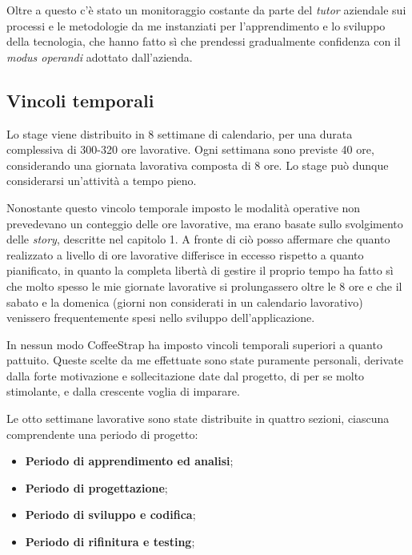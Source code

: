 Oltre a questo c'è stato un monitoraggio costante da parte del \textit{tutor} aziendale sui processi e le metodologie da me instanziati per l'apprendimento e lo sviluppo della tecnologia, che hanno fatto sì che prendessi gradualmente confidenza con il \textit{modus operandi} adottato dall'azienda.

\subsection{Vincoli temporali}

Lo stage viene distribuito in 8 settimane di calendario, per una durata complessiva di 300-320 ore lavorative. Ogni settimana sono previste 40 ore, considerando una giornata lavorativa composta di 8 ore. Lo stage può dunque considerarsi un'attività a tempo pieno.

Nonostante questo vincolo temporale imposto le modalità operative non prevedevano un conteggio delle ore lavorative, ma erano basate sullo svolgimento delle \textit{story}, descritte nel capitolo 1. A fronte di ciò posso affermare che quanto realizzato a livello di ore lavorative differisce in eccesso rispetto a quanto pianificato, in quanto la completa libertà di gestire il proprio tempo ha fatto sì che molto spesso le mie giornate lavorative si prolungassero oltre le 8 ore e che il sabato e la domenica (giorni non considerati in un calendario lavorativo) venissero frequentemente spesi nello sviluppo dell'applicazione.

In nessun modo CoffeeStrap ha imposto vincoli temporali superiori a quanto pattuito. Queste scelte da me effettuate sono state puramente personali, derivate dalla forte motivazione e sollecitazione date dal progetto, di per se molto stimolante, e dalla crescente voglia di imparare.

Le otto settimane lavorative sono state distribuite in quattro sezioni, ciascuna comprendente una periodo di progetto:

\begin{itemize}

\item \textbf{Periodo di apprendimento ed analisi};
\item \textbf{Periodo di progettazione};
\item \textbf{Periodo di sviluppo e codifica};
\item \textbf{Periodo di rifinitura e testing};

\end{itemize}

